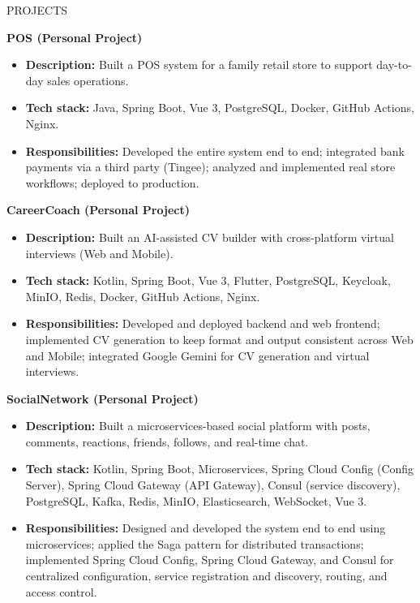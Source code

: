\documentclass{resume}
\begin{document}
\begin{rSection}{PROJECTS}
\begin{samepage}
\item \textbf{POS (Personal Project)}
\begin{itemize}
    \itemsep -3pt {}
    \item \textbf{Description:} Built a POS system for a family retail store to support day-to-day sales operations.
    \item \textbf{Tech stack:} Java, Spring Boot, Vue 3, PostgreSQL, Docker, GitHub Actions, Nginx.
    \item \textbf{Responsibilities:} Developed the entire system end to end; integrated bank payments via a third party (Tingee); analyzed and implemented real store workflows; deployed to production.
\end{itemize}
\end{samepage}

\begin{samepage}
\item \textbf{CareerCoach (Personal Project)}
\begin{itemize}
    \itemsep -3pt {}
    \item \textbf{Description:} Built an AI-assisted CV builder with cross-platform virtual interviews (Web and Mobile).
    \item \textbf{Tech stack:} Kotlin, Spring Boot, Vue 3, Flutter, PostgreSQL, Keycloak, MinIO, Redis, Docker, GitHub Actions, Nginx.
    \item \textbf{Responsibilities:} Developed and deployed backend and web frontend; implemented CV generation to keep format and output consistent across Web and Mobile; integrated Google Gemini for CV generation and virtual interviews.
\end{itemize}
\end{samepage}

\begin{samepage}
\item \textbf{SocialNetwork (Personal Project)}
\begin{itemize}
    \itemsep -3pt {}
    \item \textbf{Description:} Built a microservices-based social platform with posts, comments, reactions, friends, follows, and real-time chat.
    \item \textbf{Tech stack:} Kotlin, Spring Boot, Microservices, Spring Cloud Config (Config Server), Spring Cloud Gateway (API Gateway), Consul (service discovery), PostgreSQL, Kafka, Redis, MinIO, Elasticsearch, WebSocket, Vue 3.
    \item \textbf{Responsibilities:} Designed and developed the system end to end using microservices; applied the Saga pattern for distributed transactions; implemented Spring Cloud Config, Spring Cloud Gateway, and Consul for centralized configuration, service registration and discovery, routing, and access control.
\end{itemize}
\end{samepage}
\end{rSection} 
\end{document}
